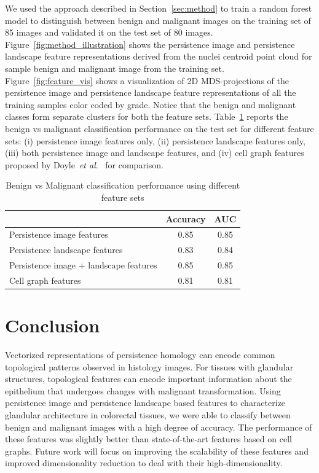 \documentclass{article}
\newcommand{\etal}{~\textit{et al}.}
\begin{document}
We used the approach described in Section~\ref{sec:method} to train a random forest model to distinguish between benign and malignant images on the training set of 85 images and validated it on the test set of 80 images. Figure~\ref{fig:method_illustration} shows the persistence image and persistence landscape feature representations derived from the nuclei centroid point cloud for sample benign and malignant image from the training set. Figure~\ref{fig:feature_vis} shows a visualization of 2D MDS-projections of the persistence image and persistence landscape feature representations of all the training samples color coded by grade. Notice that the benign and malignant classes form separate clusters for both the feature sets. Table~\ref{tab:classificaton_performance} reports the benign vs malignant classification performance on the test set for different feature sets: (i) persistence image features only, (ii) persistence landscape features only, (iii) both persistence image and landscape features, and (iv) cell graph features proposed by Doyle\etal~\cite{Doyle2008} for comparison. 
%
\vspace{-0.2cm}
\begin{table}[h]
\centering
\begin{tabular}{|l|c|c|}
\hline
 & \textbf{Accuracy} & \textbf{AUC} \\ \hline
Persistence image features & 0.85 & 0.85 \\ \hline
Persistence landscape features & 0.83 & 0.84 \\ \hline
Persistence image + landscape features & 0.85 & 0.85 \\ \hline
Cell graph features~\cite{Doyle2008} & 0.81 & 0.81 \\ \hline
\end{tabular}
\caption{Benign vs Malignant classification performance using different feature sets}
\label{tab:classificaton_performance}
\end{table}
%
\vspace{-0.4cm}
\section{Conclusion}
\label{sec:conclusion}
\vspace{-0.4cm}
Vectorized representations of persistence homology can encode common topological patterns observed in histology images. For tissues with glandular structures, topological features can encode important information about the epithelium that undergoes changes with malignant transformation. Using persistence image and persistence landscape based features to characterize glandular architecture in colorectal tissues, we were able to classify between benign and malignant images with a high degree of accuracy. The performance of these features was slightly better than state-of-the-art features based on cell graphs. Future work will focus on improving the scalability of these features and improved dimensionality reduction to deal with their high-dimensionality.

\vspace{-0.4cm}


\end{document}
